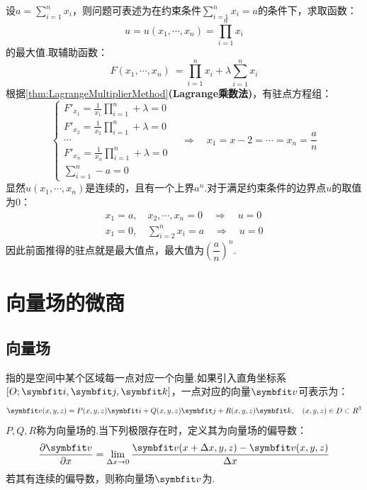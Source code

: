 \begin{solution}
    设$a = \sum_{i=1}^{n}x_i$，则问题可表述为在约束条件$\sum_{i=1}^{n}x_i = a$的条件下，求取函数：
    \[u = u(x_1,\cdots,x_n) = \prod_{i=1}^{n}x_i\]
    的最大值.取辅助函数：
    \[F(x_1,\cdots,x_n)\ = \prod_{i=1}^{n}x_i + \lambda\sum_{i=1}^{n}x_i\]
    根据\cref{thm:LagrangeMultiplierMethod}\textbf{(Lagrange乘数法)}，有驻点方程组：
    \[\begin{cases}
        \displaystyle F'_{x_1} = \frac{1}{x_1}\prod_{i=1}^{n} + \lambda = 0 \\
        \displaystyle F'_{x_2} = \frac{1}{x_2}\prod_{i=1}^{n} + \lambda = 0 \\
        \cdots \\
        \displaystyle F'_{x_n} = \frac{1}{x_n}\prod_{i=1}^{n} + \lambda = 0 \\
        \displaystyle\sum_{i=1}^{n} - a = 0
    \end{cases} \quad\Rightarrow\quad x_1 = x-2 = \cdots = x_n = \frac{a}{n}\]
    显然$u(x_1,\cdots,x_n)$是连续的，且有一个上界$a^n$.对于满足约束条件的边界点$u$的取值为$0$：
    \begin{gather*}
        x_1 = a,\quad x_2,\cdots,x_n = 0 \quad\Rightarrow\quad u = 0 \\
        x_1 = 0,\quad \sum_{i=2}^{n}x_i = a \quad\Rightarrow\quad u = 0
    \end{gather*}
    因此前面推得的驻点就是最大值点，最大值为$\left(\dfrac{a}{n}\right)^n$.
\end{solution}


\section{向量场的微商}
\subsection{向量场}
\begin{definition}
    指的是空间中某个区域每一点对应一个向量.如果引入直角坐标系$[O;\vb{i},\vb{j},\vb{k}]$，一点对应的向量$\vb{v}$可表示为：
    \[\vb{v}(x,y,z) = P(x,y,z)\vb{i} + Q(x,y,z)\vb{j} + R(x,y,z)\vb{k},\quad(x,y,z)\in D \subset \mathbb{R}^3\]
    $P,Q,R$称为向量场的.当下列极限存在时，定义其为向量场的偏导数：
    \[\pdv{\vb{v}}{x} = \lim_{\Delta x \to 0}\frac{\vb{v}(x+\Delta x,y,z) - \vb{v}(x,y,z)}{\Delta x}\]
    若其有连续的偏导数，则称向量场$\vb{v}$为.
\end{definition}

